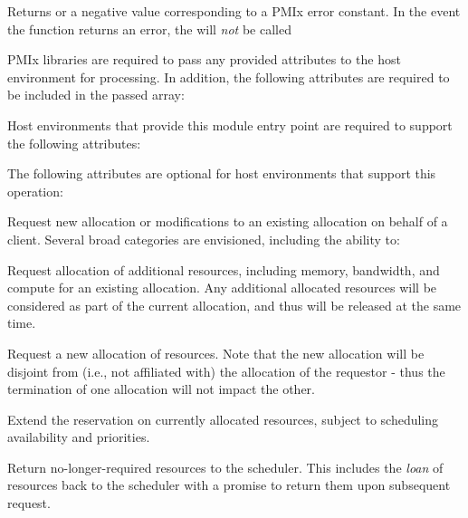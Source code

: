 Returns  or a negative value corresponding to a PMIx error constant. In the event the function returns an error, the  will \textit{not} be called

\reqattrstart
\ac{PMIx} libraries are required to pass any provided attributes to the host environment for processing. In addition, the following attributes are required to be included in the passed  array:


Host environments that provide this module entry point are required to support the following attributes:


\reqattrend

\optattrstart
The following attributes are optional for host environments that support this operation:


\optattrend

\descr

Request new allocation or modifications to an existing allocation on behalf of a client. Several broad categories are envisioned, including the ability to:

\begin{compactitem}
%
\item Request allocation of additional resources, including memory, bandwidth, and compute for an existing allocation. Any additional allocated resources will be considered as part of the current allocation, and thus will be released at the same time.
%
\item Request a new allocation of resources. Note that the new allocation will be disjoint from (i.e., not affiliated with) the allocation of the requestor - thus the termination of one allocation will not impact the other.
%
\item Extend the reservation on currently allocated resources, subject to scheduling availability and priorities.
%
\item Return no-longer-required resources to the scheduler.
This includes the \textit{loan} of resources back to the scheduler with a promise to return them upon subsequent request.
\end{compactitem}

